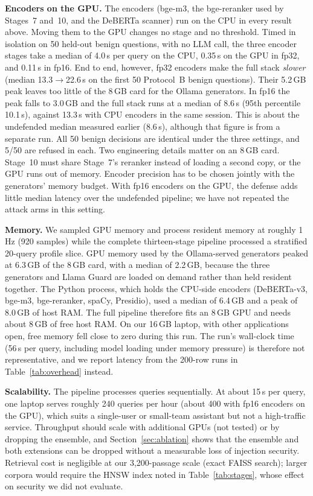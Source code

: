 \documentclass[conference]{IEEEtran}
\begin{document}
\textbf{Encoders on the GPU.} The encoders (bge-m3, the bge-reranker used by Stages~7 and~10, and the DeBERTa scanner) run on the CPU in every result above. Moving them to the GPU changes no stage and no threshold. Timed in isolation on 50 held-out benign questions, with no LLM call, the three encoder stages take a median of 4.0\,s per query on the CPU, 0.35\,s on the GPU in fp32, and 0.11\,s in fp16. End to end, however, fp32 encoders make the full stack \emph{slower} (median 13.3$\rightarrow$22.6\,s on the first 50 Protocol~B benign questions). Their 5.2\,GB peak leaves too little of the 8\,GB card for the Ollama generators. In fp16 the peak falls to 3.0\,GB and the full stack runs at a median of 8.6\,s (95th percentile 10.1\,s), against 13.3\,s with CPU encoders in the same session. This is about the undefended median measured earlier (8.6\,s), although that figure is from a separate run. All 50 benign decisions are identical under the three settings, and 5/50 are refused in each. Two engineering details matter on an 8\,GB card. Stage~10 must share Stage~7's reranker instead of loading a second copy, or the GPU runs out of memory. Encoder precision has to be chosen jointly with the generators' memory budget. With fp16 encoders on the GPU, the defense adds little median latency over the undefended pipeline; we have not repeated the attack arms in this setting.

\textbf{Memory.} We sampled GPU memory and process resident memory at roughly 1\,Hz (920 samples) while the complete thirteen-stage pipeline processed a stratified 20-query profile slice. GPU memory used by the Ollama-served generators peaked at 6.3\,GB of the 8\,GB card, with a median of 2.2\,GB, because the three generators and Llama Guard are loaded on demand rather than held resident together. The Python process, which holds the CPU-side encoders (DeBERTa-v3, bge-m3, bge-reranker, spaCy, Presidio), used a median of 6.4\,GB and a peak of 8.0\,GB of host RAM. The full pipeline therefore fits an 8\,GB GPU and needs about 8\,GB of free host RAM. On our 16\,GB laptop, with other applications open, free memory fell close to zero during this run. The run's wall-clock time (56\,s per query, including model loading under memory pressure) is therefore not representative, and we report latency from the 200-row runs in Table~\ref{tab:overhead} instead.

\textbf{Scalability.} The pipeline processes queries sequentially. At about 15\,s per query, one laptop serves roughly 240 queries per hour (about 400 with fp16 encoders on the GPU), which suits a single-user or small-team assistant but not a high-traffic service. Throughput should scale with additional GPUs (not tested) or by dropping the ensemble, and Section~\ref{sec:ablation} shows that the ensemble and both extensions can be dropped without a measurable loss of injection security. Retrieval cost is negligible at our 3{,}200-passage scale (exact FAISS search); larger corpora would require the HNSW index noted in Table~\ref{tab:stages}, whose effect on security we did not evaluate.
\end{document}
